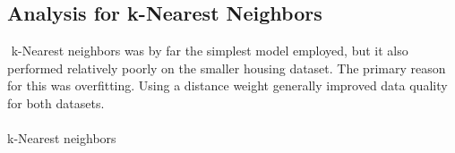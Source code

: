\documentclass[h]{article}
\begin{document}
\subsection*{Analysis for k-Nearest Neighbors} k-Nearest neighbors was by far the simplest model employed, but it also 
performed relatively poorly on the smaller housing dataset.  The primary reason for this was 
overfitting.  Using a distance weight generally improved data quality for both datasets.
\\ \\
k-Nearest neighbors
\end{document}
